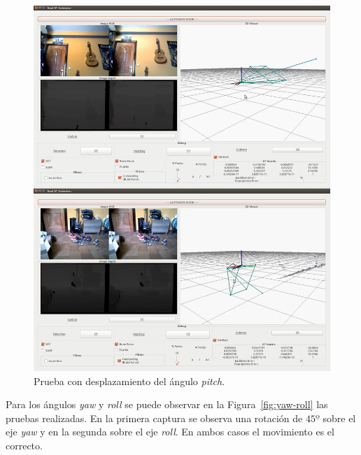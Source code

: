 \begin{figure}[th]
\centering
\includegraphics[scale=0.3]{Figures/tests/pitch.png}
\decoRule
\caption[Prueba con desplazamiento del ángulo \textit{pitch}]{Prueba con desplazamiento del ángulo \textit{pitch}.}
\label{fig:pitch}
\end{figure}

Para los ángulos \textit{yaw} y \textit{roll} se puede observar en la Figura~\ref{fig:yaw-roll} las pruebas realizadas. En la primera captura se observa una rotación de $45º$ sobre el eje \textit{yaw} y en la segunda sobre el eje \textit{roll}. En ambos casos el movimiento es el correcto.

